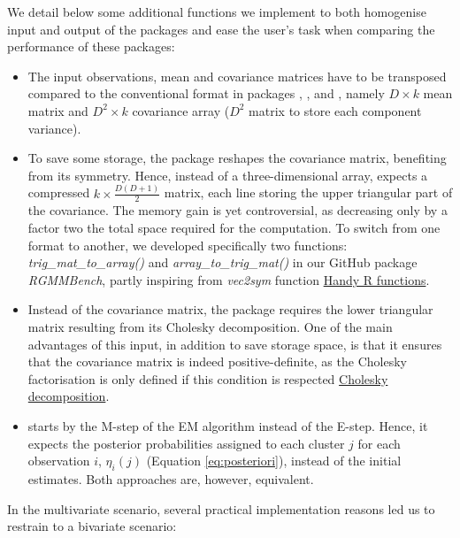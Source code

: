 We detail below some additional functions we implement to both homogenise input and output of the packages and ease the user's task when comparing the performance of these packages:

\begin{itemize}
\item
  The input observations, mean and covariance matrices have to be transposed compared to the conventional format in packages , ,  and , namely \(D \times k\) mean matrix and \(D^2 \times k\) covariance array (\(D^2\) matrix to store each component variance).
\item
  To save some storage, the  package reshapes the covariance matrix, benefiting from its symmetry. Hence, instead of a three-dimensional array,  expects a compressed \(k \times \frac{D(D+1)}{2}\) matrix, each line storing the upper triangular part of the covariance. The memory gain is yet controversial, as decreasing only by a factor two the total space required for the computation. To switch from one format to another, we developed specifically two functions: \emph{trig\_mat\_to\_array()} and \emph{array\_to\_trig\_mat()} in our GitHub package \emph{RGMMBench}, partly inspiring from \emph{vec2sym} function \href{https://rdrr.io/github/patr1ckm/patr1ckm/man/vec2sym.html}{Handy R functions}.
\item
  Instead of the covariance matrix, the  package requires the lower triangular matrix resulting from its Cholesky decomposition. One of the main advantages of this input, in addition to save storage space, is that it ensures that the covariance matrix is indeed positive-definite, as the Cholesky factorisation is only defined if this condition is respected \href{https://en.wikipedia.org/wiki/Cholesky_decomposition}{Cholesky decomposition}.
\item
   starts by the M-step of the EM algorithm instead of the E-step. Hence, it expects the posterior probabilities assigned to each cluster \(j\) for each observation \(i\), \(\eta_i(j)\) (Equation \eqref{eq:posteriori}), instead of the initial estimates. Both approaches are, however, equivalent.
\end{itemize}

In the multivariate scenario, several practical implementation reasons led us to restrain to a bivariate scenario:

